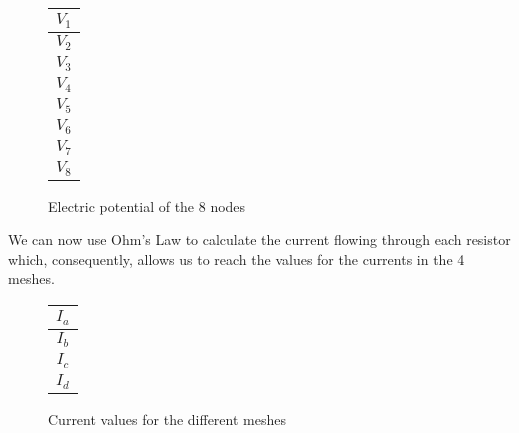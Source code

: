 \begin{figure}[h]
	\begin{center}
	    \begin{minipage}{.3\textwidth}
		\flushright
		\begin{tabular}{|c|}
		    \hline
		    $V_1$ \\
		    \hline
		    $V_2$ \\
		    \hline
		    $V_3$ \\
		    \hline
		    $V_4$ \\
		    \hline
		    $V_5$ \\
		    \hline
		    $V_6$ \\
		    \hline
		    $V_7$ \\
		    \hline
		    $V_8$ \\
		    \hline
		\end{tabular}
	    \end{minipage}
	    \hspace{-8pt}
	    \begin{minipage}{.3\textwidth}
		\flushleft
		
	    \end{minipage}
	\end{center}
	\caption{Electric potential of the 8 nodes}
	\label{theory_voltages}
\end{figure}


We can now use Ohm's Law to calculate the current flowing through each resistor which, consequently, allows us to reach the values for the currents in the 4 meshes.

\begin{figure}[h]
	\begin{center}
	    \begin{minipage}{.3\textwidth}
		\flushright
		\begin{tabular}{|c|}
		    \hline
		    $I_a$ \\
		    \hline
		    $I_b$ \\
		    \hline
		    $I_c$ \\
		    \hline
		    $I_d$ \\
		    \hline
		\end{tabular}
	    \end{minipage}
	    \hspace{-8pt}
	    \begin{minipage}{.3\textwidth}
		\flushleft
		
	    \end{minipage}
	\end{center}
	\caption{Current values for the different meshes}
	\label{theory_currents}
\end{figure}

